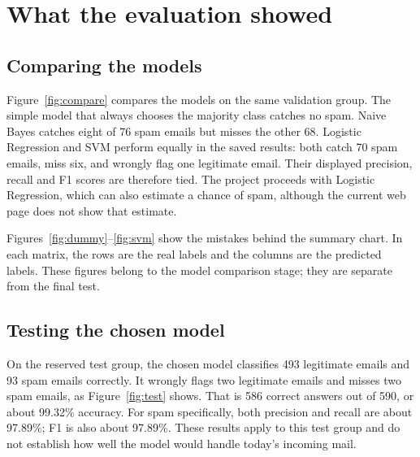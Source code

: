 \chapter{What the evaluation showed}
\section{Comparing the models}
Figure~\ref{fig:compare} compares the models on the same validation group. The simple model that always chooses the majority class catches no spam. Naive Bayes catches eight of 76 spam emails but misses the other 68. Logistic Regression and SVM perform equally in the saved results: both catch 70 spam emails, miss six, and wrongly flag one legitimate email. Their displayed precision, recall and F1 scores are therefore tied. The project proceeds with Logistic Regression, which can also estimate a chance of spam, although the current web page does not show that estimate.


Figures~\ref{fig:dummy}--\ref{fig:svm} show the mistakes behind the summary chart. In each matrix, the rows are the real labels and the columns are the predicted labels. These figures belong to the model comparison stage; they are separate from the final test.


\section{Testing the chosen model}
On the reserved test group, the chosen model classifies 493 legitimate emails and 93 spam emails correctly. It wrongly flags two legitimate emails and misses two spam emails, as Figure~\ref{fig:test} shows. That is 586 correct answers out of 590, or about 99.32\% accuracy. For spam specifically, both precision and recall are about 97.89\%; F1 is also about 97.89\%. These results apply to this test group and do not establish how well the model would handle today's incoming mail.

